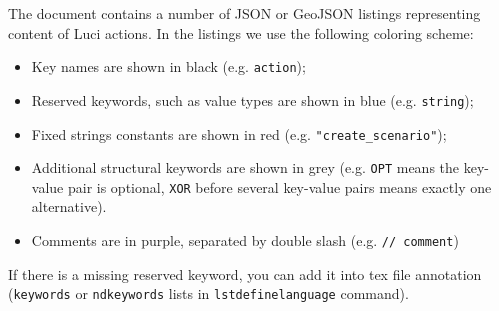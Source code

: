 The document contains a number of JSON or GeoJSON listings representing content of \ac{Luci} actions.
In the listings we use the following coloring scheme:
%
\begin{itemize}
\item Key names are shown in black (e.g. \texttt{action});
\item Reserved keywords, such as value types are shown in blue (e.g. \texttt{\color{blue}string});
\item Fixed strings constants are shown in red (e.g. \texttt{\color{red}"create\_scenario"});
\item Additional structural keywords are shown in grey
(e.g. \texttt{\color{darkgray}OPT} means the key-value pair is optional, \texttt{\color{darkgray}XOR} before several key-value pairs means exactly one alternative).
\item Comments are in purple, separated by double slash (e.g. \texttt{\color{purple}// comment})
\end{itemize}
%
If there is a missing reserved keyword, you can add it into tex file annotation (\texttt{keywords} or \texttt{ndkeywords} lists in \texttt{lstdefinelanguage} command).

\clearpage
